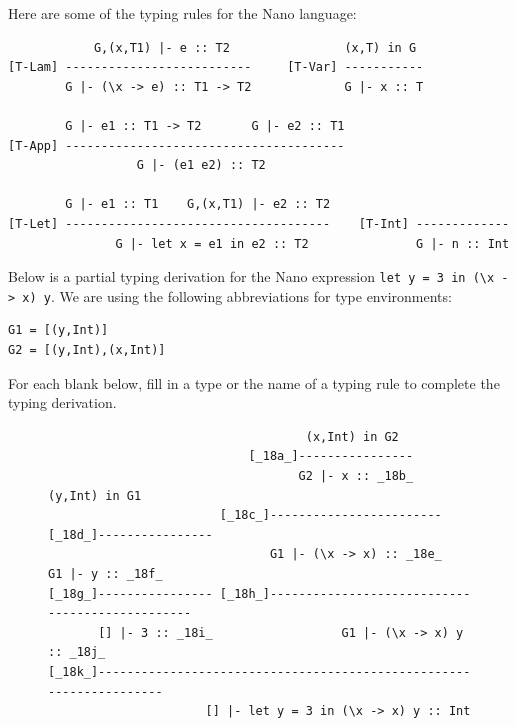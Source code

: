 \documentclass[addpoints]{exam}
\begin{document}
\begin{questions}
\newpage

\question Here are some of the typing rules for the Nano language:

{\small
\begin{verbatim}
            G,(x,T1) |- e :: T2                (x,T) in G                
[T-Lam] --------------------------     [T-Var] -----------
        G |- (\x -> e) :: T1 -> T2             G |- x :: T

        G |- e1 :: T1 -> T2       G |- e2 :: T1  
[T-App] ---------------------------------------
                  G |- (e1 e2) :: T2
                             
        G |- e1 :: T1    G,(x,T1) |- e2 :: T2
[T-Let] -------------------------------------    [T-Int] -------------
               G |- let x = e1 in e2 :: T2               G |- n :: Int
\end{verbatim}
}

Below is a partial typing derivation for the Nano expression \verb|let y = 3 in (\x -> x) y|.  We are using the following abbreviations for type environments:
\begin{verbatim}
G1 = [(y,Int)]
G2 = [(y,Int),(x,Int)]
\end{verbatim}
For each blank below, fill in a type or the name of a typing rule to complete the typing derivation.
\begin{figure}[h]
\advance\leftskip-20cm
{\small
\begin{verbatim}
                                    (x,Int) in G2
                            [_18a_]----------------
                                   G2 |- x :: _18b_             (y,Int) in G1
                        [_18c_]------------------------ [_18d_]----------------
                               G1 |- (\x -> x) :: _18e_        G1 |- y :: _18f_
[_18g_]---------------- [_18h_]------------------------------------------------
       [] |- 3 :: _18i_                  G1 |- (\x -> x) y :: _18j_
[_18k_]--------------------------------------------------------------------
                      [] |- let y = 3 in (\x -> x) y :: Int
\end{verbatim}
}
\end{figure}

\end{questions}
\end{document}
